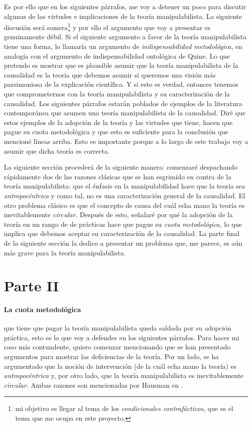 Es por ello que en los siguientes párrafos, me voy a detener
un poco para discutir algunas de las virtudes e
implicaciones de la teoría manipulabilista. La siguiente
discusión será somera\footnote{
  mi objetivo es llegar al tema de los \emph{condicionales
  contrafácticos,} que es el tema que me ocupa en este
  proyecto.  
}
y por ello el argumento que voy a presentar es genuinamente
débil. Si el siguiente argumento a favor de la teoría
manipulabilista tiene una forma, lo llamaría un argumento de
\emph{indispensabilidad metodológica,} en analogía con el
argumento de indispensabilidad ontológica de Quine. Lo que
pretendo es mostrar que es plausible asumir que la teoría
manipulabilista de la causalidad es la teoría que debemos
asumir si queremos una visión más parsimoniosa de la
explicación científica. Y si esto es verdad, entonces
tenemos que comprometernos con la teoría manipulabilista y
su caracterización de la causalidad. Los siguientes párrafos
estarán poblados de ejemplos de la literatura contemporánea
que asumen una teoría manipulabilista de la causalidad. Diré
que estos ejemplos de la adopción de la teoría y las
virtudes que tiene, hacen que pague su cuota metodológica y
que esto es suficiente para la conclusión que mencioné líneas arriba. Esto es importante porque a lo largo
de este trabajo voy a asumir que dicha teoría es correcta.

La siguiente sección procederá de la siguiente manera:
comenzaré despachando rápidamente dos de las razones
clásicas que se han esgrimido en contra de la teoría
manipulabilista: que el énfasis en la manipulabilidad hace
que la teoría sea \emph{antropocéntrica} y como tal, no es
una caracterización general de la causalidad. El otro
problema clásico es que el concepto de causa del cuál echa
mano la teoría es inevitablemente \emph{circular.} Después
de esto, señalaré por qué la adopción de la teoría en un
rango de de prácticas hace que pague su \emph{cuota
metodológica,} lo que implica que debemos aceptar su
caracterización de la causalidad. La parte final de la
siguiente sección la dedico a presentar un problema que, me
parece, es aún más grave para la teoría manipulabilista.


\section*{Parte II}
\label{pii}


\paragraph{La cuota metodológica} que tiene que pagar la
teoría manipulabilista queda saldada por su adopción
práctica, esto es lo que voy a defender en los siguientes
párrafos. Para hacer mi caso más contundente, quiero
comenzar mencionando que se han presentado argumentos
para mostrar las deficiencias de la teoría. Por un lado, se
ha argumentado que la noción de intervención (de la cuál
echa mano la teoría) es \emph{antropocéntrica} y, por otro
lado, que la teoría manipulabilista es inevitablemente
\emph{circular.} Ambas razones son mencionadas por Hausman
en .	

